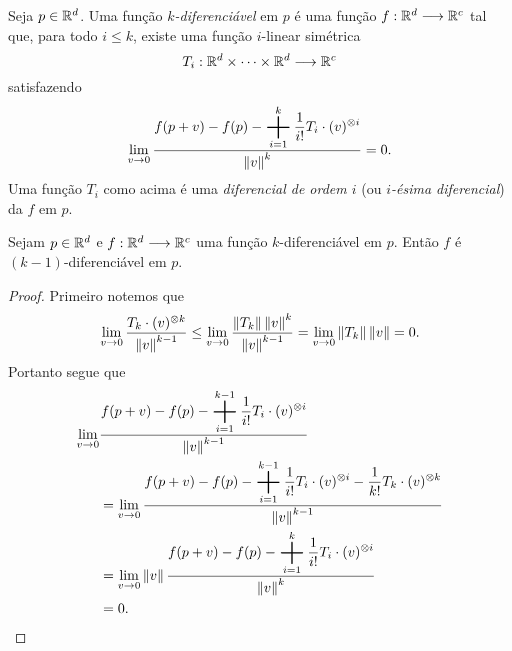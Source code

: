 \begin{defi}
Seja $p \in \mathbb{R}^d$. Uma função \emph{$k$-diferenciável} em $p$ é uma função $f: \mathbb{R}^d \longrightarrow \mathbb{R}^c$ tal que, para todo $i \leq k$, existe uma função $i$-linear simétrica
	\begin{equation*}
	T_i: \mathbb{R}^d \times \cdots \times \mathbb{R}^d \longrightarrow \mathbb{R}^c
	\end{equation*}
satisfazendo
	\begin{equation*}
	\lim_{v \conv 0} \frac{\displaystyle f(p+v)-f(p)- \bigplus_{i=1}^k \frac{1}{i!}T_i \cdot (v)^{\otimes i}}{\nor{v}^k} = 0.
	\end{equation*}
Uma função $T_i$ como acima é uma \emph{diferencial de ordem $i$} (ou \emph{$i$-ésima diferencial}) da $f$ em $p$.
\end{defi}

\begin{prop}
Sejam $p \in \mathbb{R}^d$ e $f: \mathbb{R}^d \longrightarrow \mathbb{R}^c$ uma função $k$-diferenciável em $p$. Então $f$ é $(k-1)$-diferenciável em $p$.
\end{prop}
\begin{proof}
Primeiro notemos que
	\begin{equation*}
	\lim_{v \rightarrow 0} \frac{T_k \cdot (v)^{\otimes k}}{\left\Vert{v}\right\Vert^{k-1}} \leq \lim_{v \rightarrow 0} \frac{\left\Vert{T_k}\right\Vert \left\Vert{v}\right\Vert^k}{\left\Vert{v}\right\Vert^{k-1}} = \lim_{v \rightarrow 0} \left\Vert{T_k}\right\Vert\left\Vert{v}\right\Vert = 0.
	\end{equation*}
Portanto segue que	
	\begin{align*}
	\lim_{v \conv 0} &\frac{\displaystyle f(p+v)-f(p)- \bigplus_{i=1}^{k-1} \frac{1}{i!}T_i \cdot (v)^{\otimes i}}{\nor{v}^{k-1}} \\
		&= \lim_{v \conv 0} \frac{\displaystyle f(p+v)-f(p)- \bigplus_{i=1}^{k-1} \frac{1}{i!}T_i \cdot (v)^{\otimes i}-\frac{1}{k!}T_k \cdot (v)^{\otimes k}}{\nor{v}^{k-1}}\\
		&= \lim_{v \conv 0} \nor{v}\frac{\displaystyle f(p+v)-f(p)- \bigplus_{i=1}^k \frac{1}{i!}T_i \cdot (v)^{\otimes i}}{\nor{v}^k} \\
		&= 0.
	\end{align*}
\end{proof}

